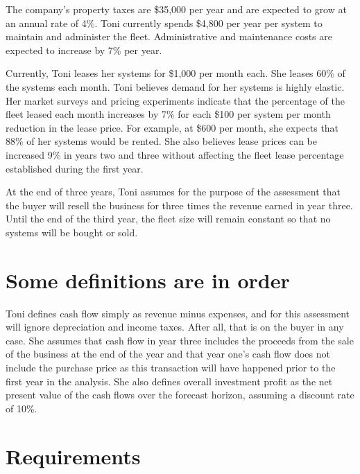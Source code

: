 \documentclass[
]{book}
\begin{document}
The company's property taxes are \$35,000 per year and are expected to grow at an annual rate of 4\%. Toni currently spends \$4,800 per year per system to maintain and administer the fleet. Administrative and maintenance costs are expected to increase by 7\% per year.

Currently, Toni leases her systems for \$1,000 per month each. She leases 60\% of the systems each month. Toni believes demand for her systems is highly elastic. Her market surveys and pricing experiments indicate that the percentage of the fleet leased each month increases by 7\% for each \$100 per system per month reduction in the lease price. For example, at \$600 per month, she expects that 88\% of her systems would be rented. She also believes lease prices can be increased 9\% in years two and three without affecting the fleet lease percentage established during the first year.

At the end of three years, Toni assumes for the purpose of the assessment that the buyer will resell the business for three times the revenue earned in year three. Until the end of the third year, the fleet size will remain constant so that no systems will be bought or sold.

\hypertarget{some-definitions-are-in-order}{%
\section{Some definitions are in order}\label{some-definitions-are-in-order}}

Toni defines cash flow simply as revenue minus expenses, and for this assessment will ignore depreciation and income taxes. After all, that is on the buyer in any case. She assumes that cash flow in year three includes the proceeds from the sale of the business at the end of the year and that year one's cash flow does not include the purchase price as this transaction will have happened prior to the first year in the analysis. She also defines overall investment profit as the net present value of the cash flows over the forecast horizon, assuming a discount rate of 10\%.

\hypertarget{requirements}{%
\section{Requirements}\label{requirements}}
\end{document}
